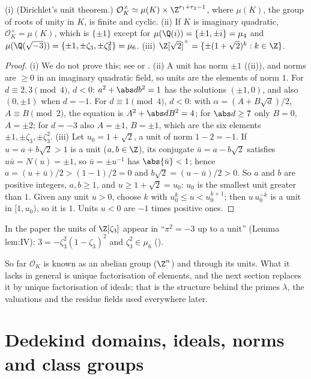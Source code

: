 \begin{theorem}[units]\label{thm:ant:units}
(i) (Dirichlet's unit theorem.) $\mathcal O_K^\times\simeq\mu(K)\times\Z^{r_1+r_2-1}$, where $\mu(K)$, the group of roots of unity in $K$, is finite
and cyclic. (ii) If $K$ is imaginary quadratic, $\mathcal O_K^\times=\mu(K)$, which is $\{\pm1\}$ except for $\mu(\Q(i))=\{\pm1,\pm i\}=\mu_4$ and
$\mu(\Q(\sqrt{-3}))=\{\pm1,\pm\zeta_3,\pm\zeta_3^2\}=\mu_6$. (iii) $\Z[\sqrt2]^\times=\{\pm(1+\sqrt2)^k:k\in\Z\}$.
\end{theorem}

\begin{proof}
(i) We do not prove this; see \cite[Chapter I, Section 7]{Neukirch} or \cite[Chapter 5]{Marcus77}. (ii) A unit has norm $\pm1$
((ii)), and norms are $\ge0$ in an imaginary quadratic field, so units are the elements of norm $1$. For $d\equiv2,3\pmod4$,
$d<0$: $a^2+\abs db^2=1$ has the solutions $(\pm1,0)$, and also $(0,\pm1)$ when $d=-1$. For $d\equiv1\pmod4$, $d<0$: with $\alpha=(A+B\sqrt d)/2$, $A\equiv B
\pmod2$, the equation is $A^2+\abs dB^2=4$; for $\abs d\ge7$ only $B=0$, $A=\pm2$; for $d=-3$ also $A=\pm1$, $B=\pm1$, which are the six elements
$\pm1,\pm\zeta_3,\pm\zeta_3^2$. (iii) Let $u_0=1+\sqrt2$, a unit of norm $1-2=-1$. If $u=a+b\sqrt2>1$ is a unit ($a,b\in\Z$), its conjugate
$\bar u=a-b\sqrt2$ satisfies $u\bar u=N(u)=\pm1$, so $\bar u=\pm u^{-1}$ has $\abs{\bar u}<1$; hence $a=(u+\bar u)/2>(1-1)/2=0$ and $b\sqrt2=(u-\bar u)/2>0$.
So $a$ and $b$ are positive integers, $a,b\ge1$, and $u\ge1+\sqrt2=u_0$: $u_0$ is the smallest unit greater than $1$. Given any unit $u>0$, choose $k$ with
$u_0^k\le u<u_0^{k+1}$; then $u\,u_0^{-k}$ is a unit in $[1,u_0)$, so it is $1$. Units $u<0$ are $-1$ times positive ones.
\end{proof}

In the paper the units of $\Z[\zeta_3]$ appear in ``$\pi^2=-3$ up to a unit'' (Lemma lem:IV):
$3=-\zeta_3^2(1-\zeta_3)^2$ and $\zeta_3^2\in\mu_6$ ().

So far $\mathcal O_K$ is known as an abelian group ($\Z^n$) and through its units. What it lacks in general is unique factorisation of elements, and
the next section replaces it by unique factorisation of ideals; that is the structure behind the primes $\lambda$, the valuations and the residue fields used
everywhere later.

\section{Dedekind domains, ideals, norms and class groups}\label{sec:ant:dedekind}

